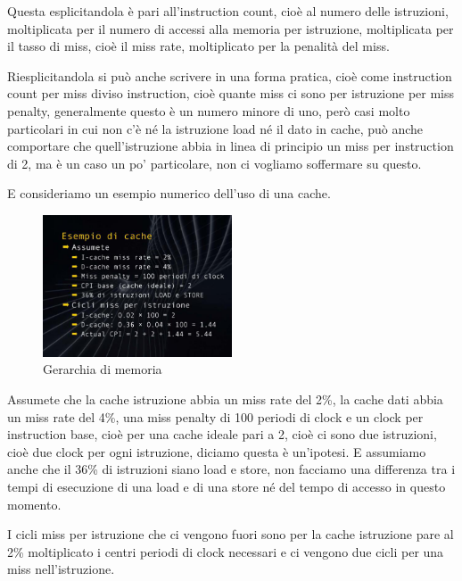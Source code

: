 Questa esplicitandola è pari all'instruction count, cioè al numero delle istruzioni, moltiplicata per il numero di accessi alla memoria per istruzione, moltiplicata per il tasso di miss, cioè il miss rate, moltiplicato per la penalità del miss.

Riesplicitandola si può anche scrivere in una forma pratica, cioè come instruction count per miss diviso instruction, cioè quante miss ci sono per istruzione per miss penalty, generalmente questo è un numero minore di uno, però casi molto particolari in cui non c'è né la istruzione load né il dato in cache, può anche comportare che quell'istruzione abbia in linea di principio un miss per instruction di 2, ma è un caso un po' particolare, non ci vogliamo soffermare su questo.

E consideriamo un esempio numerico dell'uso di una cache.

\FloatBarrier
\begin{figure}[H]
  \centering
  \includegraphics[width=0.50\textwidth,
                    trim=20 40 10 40, %
                    clip]
                    {images/Lez06_p04_fig_03.png}
  \caption{Gerarchia di memoria}
  \label{fig:Lez06_p04_fig_03}
\end{figure}
\FloatBarrier
\noindent

Assumete che la cache istruzione abbia un miss rate del 2\%, la cache dati abbia un miss rate del 4\%, una miss penalty di 100 periodi di clock e un clock per instruction base, cioè per una cache ideale pari a 2, cioè ci sono due istruzioni, cioè due clock per ogni istruzione, diciamo questa è un'ipotesi.
E assumiamo anche che il 36\% di istruzioni siano load e store, non facciamo una differenza tra i tempi di esecuzione di una load e di una store né del tempo di accesso in questo momento.

I cicli miss per istruzione che ci vengono fuori sono per la cache istruzione pare al 2\% moltiplicato i centri periodi di clock necessari e ci vengono due cicli per una miss nell'istruzione.

